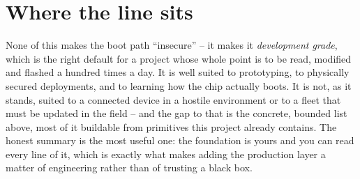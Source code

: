 \section{Where the line sits}

None of this makes the boot path ``insecure'' -- it makes it \emph{development
grade}, which is the right default for a project whose whole point is to be read,
modified and flashed a hundred times a day. It is well suited to prototyping, to
physically secured deployments, and to learning how the chip actually boots. It is
not, as it stands, suited to a connected device in a hostile environment or to a
fleet that must be updated in the field -- and the gap to that is the concrete,
bounded list above, most of it buildable from primitives this project already
contains. The honest summary is the most useful one: the foundation is yours and
you can read every line of it, which is exactly what makes adding the production
layer a matter of engineering rather than of trusting a black box.
